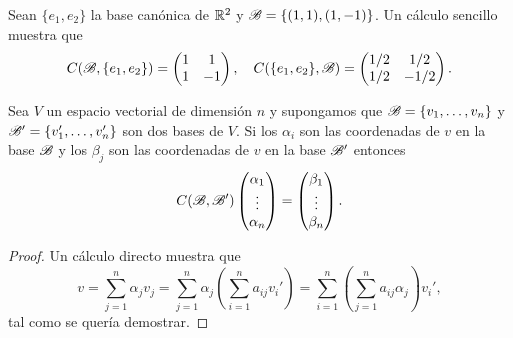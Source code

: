 \begin{example}
	Sean $\{e_1,e_2\}$ la base canónica de $\mathbb{R}^2$ y $\mathscr{B}=\{(1,1),(1,-1)\}$.  Un
	cálculo sencillo muestra que 
	\[
		C(\mathscr{B},\{e_1,e_2\})=
		\begin{pmatrix} 
			1 & 1\\
			1 & -1
		\end{pmatrix},
		\quad
		C(\{e_1,e_2\},\mathscr{B})=\begin{pmatrix}
			1/2 & 1/2\\
			1/2 & -1/2
		\end{pmatrix}.
	\]
\end{example}

\begin{prop}
	\label{pro:coordenadas}
	Sea $V$ un espacio vectorial de dimensión $n$ y supongamos que 
	$\mathscr{B}=\{v_1,\dots,v_n\}$ y $\mathscr{B}'=\{v_1',\dots,v_n'\}$ son dos bases de
	$V$. Si los $\alpha_i$ son las coordenadas de $v$ en la base $\mathscr{B}$ y los
	$\beta_j$ son las coordenadas de $v$ en la base $\mathscr{B}'$ entonces 
	\begin{align}
		\label{eq:cambio_de_coordenadas}
		C(\mathscr{B},\mathscr{B}')
		\begin{pmatrix}
			\alpha_1\\
			\vdots\\
			\alpha_n
		\end{pmatrix}
		=
		\begin{pmatrix}
			\beta_1\\
			\vdots\\
			\beta_n
		\end{pmatrix}.
	\end{align}

	\begin{proof}
		Un cálculo directo muestra que 
		\[
		v=\sum_{j=1}^n \alpha_jv_j=\sum_{j=1}^n\alpha_j\left(\sum_{i=1}^na_{ij}v_i'\right)=\sum_{i=1}^n\left(\sum_{j=1}^na_{ij}\alpha_j\right)v_i',
		\]
		tal como se quería demostrar.
	\end{proof}
\end{prop}

